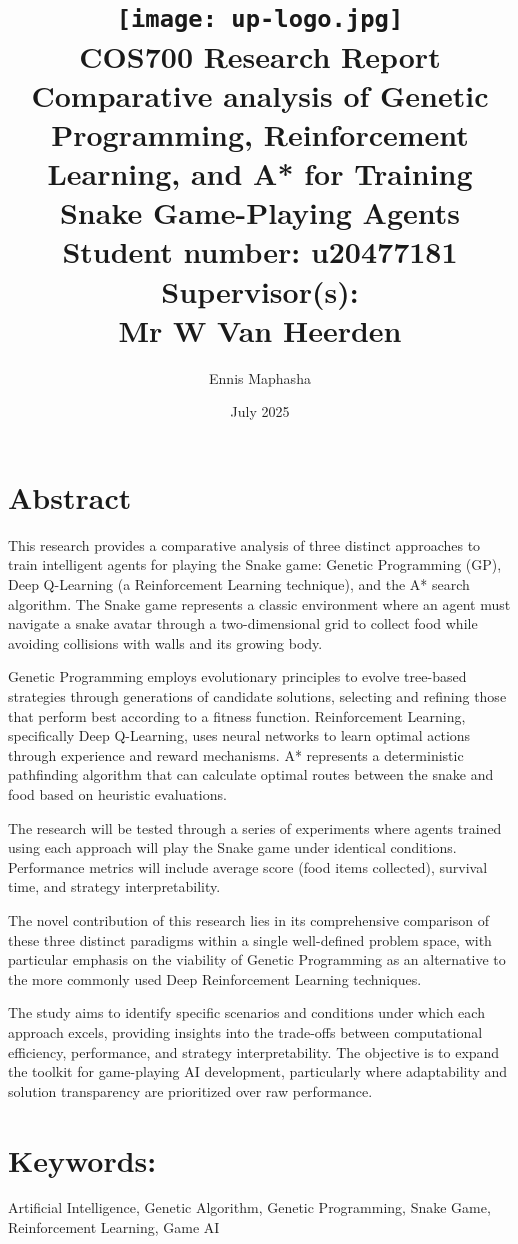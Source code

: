 \documentclass[a4paper,12pt]{article}
\title
{
   \texttt{[image: up-logo.jpg]} \\
   \vspace{2cm}
   \textbf{COS700 Research Report} \\ \vspace{0.5cm}
   \textbf{Comparative analysis of Genetic Programming, Reinforcement Learning, and A* for Training Snake Game-Playing Agents} \\ \vspace{0.5cm}
   \textbf{Student number:} u20477181 \\ \vspace{0.5cm}
   \textbf{Supervisor(s)}: \\ Mr W Van Heerden
}
\author{Ennis Maphasha}
\date{July 2025}
\begin{document}
\maketitle

\newpage
\linespread{1.241}

\section*{Abstract}
This research provides a comparative analysis of three distinct approaches to train intelligent agents for playing the Snake game: 
Genetic Programming (GP), Deep Q-Learning (a Reinforcement Learning technique), 
and the A* search algorithm. 
The Snake game represents a classic environment where an agent must navigate a snake avatar through a two-dimensional grid to collect food while avoiding collisions with walls and its growing body. 

Genetic Programming employs evolutionary principles to evolve tree-based strategies through generations of candidate solutions, 
selecting and refining those that perform best according to a fitness function. 
Reinforcement Learning, specifically Deep Q-Learning, uses neural networks to learn optimal actions through experience and reward mechanisms. 
A* represents a deterministic pathfinding algorithm that can calculate optimal routes between the snake and food based on heuristic evaluations.

The research will be tested through a series of experiments where agents trained using each approach will play the Snake game under identical conditions. 
Performance metrics will include average score (food items collected), survival time, and strategy interpretability.

The novel contribution of this research lies in its comprehensive comparison of these three distinct paradigms within a single well-defined problem space, 
with particular emphasis on the viability of Genetic Programming as an alternative to the more commonly used Deep Reinforcement Learning techniques. 

The study aims to identify specific scenarios and conditions under which each approach excels, 
providing insights into the trade-offs between computational efficiency, performance, and strategy interpretability. 
The objective is to expand the toolkit for game-playing AI development, particularly where adaptability and solution transparency are prioritized over raw performance.

\section*{Keywords:}
Artificial Intelligence, Genetic Algorithm, Genetic Programming, Snake Game, Reinforcement Learning, Game AI
\end{document}
